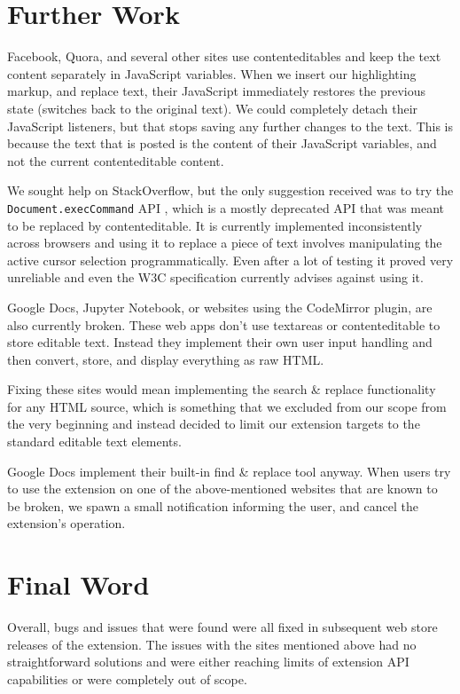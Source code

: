 \documentclass[bsc,frontabs,twoside,singlespacing,parskip,deptreport]{infthesis}
\begin{document}
\section{Further Work}
Facebook, Quora, and several other sites use contenteditables and keep the text content separately in JavaScript variables. When we insert our highlighting markup, and replace text, their JavaScript immediately restores the previous state (switches back to the original text). We could completely detach their JavaScript listeners, but that stops saving any further changes to the text. This is because the text that is posted is the content of their JavaScript variables, and not the current contenteditable content.

We sought help on StackOverflow, but the only suggestion received was to try the \texttt{Document.execCommand} API \cite{A10}, which is a mostly deprecated API that was meant to be replaced by contenteditable. It is currently implemented inconsistently across browsers and using it to replace a piece of text involves manipulating the active cursor selection programmatically. Even after a lot of testing it proved very unreliable and even the W3C specification currently advises against using it.

Google Docs, Jupyter Notebook, or websites using the CodeMirror plugin, are also currently broken. These web apps don't use textareas or contenteditable to store editable text. Instead they implement their own user input handling and then convert, store, and display everything as raw HTML.

Fixing these sites would mean implementing the search \& replace functionality for any HTML source, which is something that we excluded from our scope from the very beginning and instead decided to limit our extension targets to the standard editable text elements.

Google Docs implement their built-in find \& replace tool anyway. When users try to use the extension on one of the above-mentioned websites that are known to be broken, we spawn a small notification informing the user, and cancel the extension's operation.

\section{Final Word}
Overall, bugs and issues that were found were all fixed in subsequent web store releases of the extension. The issues with the sites mentioned above had no straightforward solutions and were either reaching limits of extension API capabilities or were completely out of scope.
\end{document}
